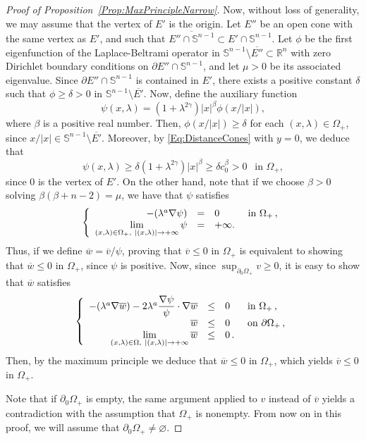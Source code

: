 \documentclass[12pt,reqno]{amsart}
\theoremstyle{definition}
\theoremstyle{remark}
\newcommand{\con}[1]{\mathbb{#1}}
\newcommand{\R}{\con{R}} %
\newcommand{\Sph}{\con{S}} %
\newcommand{\s}{\gamma}
\newcommand\beqc[1]{\left\{\begin{array}{#1}}
\newcommand\eeqc{\end{array} \right.}
\def\PDEsystem{rcll}
\let\div\relax
\DeclareMathOperator{\div}{div}
\def\ds{\displaystyle}
\numberwithin{equation}{section}
\begin{document}
\begin{proof}[Proof of Proposition~\ref{Prop:MaxPrincipleNarrow}]
Now, without loss of generality, we may assume that the vertex of $E'$ is the origin. Let $E''$ be an open cone with the same vertex as $E'$, and such that $\overline{E''\cap \Sph^{n-1}} \subset E'\cap \Sph^{n-1}$. Let $\phi$ be the first eigenfunction of the Laplace-Beltrami operator in $\Sph^{n-1} \setminus \overline{E''}\subset \R^n$ with zero Dirichlet boundary conditions on $\partial E'' \cap \Sph^{n-1}$, and let $\mu>0$ be its associated eigenvalue. Since $\partial E'' \cap \Sph^{n-1}$ is contained in $E'$, there exists a positive constant $\delta$ such that $\phi\geq \delta > 0$ in $\Sph^{n-1} \setminus \overline{E'}$. Now, define the auxiliary function
$$ 
\psi(x,\lambda) = (1+\lambda^{2\s}) |x|^\beta \phi(x/|x|), 
$$
where $\beta$ is a positive real number. Then, $\phi(x/|x|)\geq \delta$ for each $(x,\lambda) \in\Omega_+$,  since $x/|x| \in \Sph^{n-1} \setminus \overline{E'}$. Moreover, by \eqref{Eq:DistanceCones} with $y=0$, we deduce that
$$ 
\psi(x,\lambda) \geq \delta (1+\lambda^{2\s}) |x|^\beta \geq \delta c_0^\beta > 0 \ \ \text{ in } \Omega_+,
$$
since $0$ is the vertex of $E'$.
On the other hand, note that if we choose $\beta>0$ solving $\beta(\beta+n-2)=\mu$, we have that $\psi$ satisfies
$$
\beqc{\PDEsystem}
-\div(\lambda^a \nabla \psi) &=& 0 & \text{ in } \Omega_+\,, \\
\ds \lim_{(x,\lambda)\in \Omega_+, \ |(x,\lambda)|\to +\infty} \psi & = & +\infty.
\eeqc
$$
Thus, if we define $\overline{w}=\overline{v}/\psi$, proving that $\overline{v} \leq 0$ in $\Omega_+$ is equivalent to showing that $\overline{w}\leq 0$ in $\Omega_+$, since $\psi$ is positive. Now, since $\sup_{\partial_0 \Omega_+} v \geq 0$, it is easy to show that $\overline{w}$ satisfies
\begin{equation}
\label{Eq:wTildeEquationNarrow}
\beqc{\PDEsystem}
-\div(\lambda^a \nabla \overline{w})-2\lambda^a\dfrac{\nabla \psi}{\psi}\cdot\nabla \overline{w} &\leq& 0 & \text{ in } \Omega_+\,, \\
\overline{w} &\leq& 0 & \text{ on } \partial\Omega_+\,, \\
\ds \lim_{(x,\lambda)\in \Omega, \ |(x,\lambda)|\to +\infty} \overline{w} & \leq & 0\,.
\eeqc
\end{equation}
Then, by the maximum principle we deduce that $\overline{w}\leq 0$ in $\Omega_+$, which yields $\overline{v}\leq 0$ in $\Omega_+$.

Note that if $\partial_0 \Omega_+$ is empty, the same argument applied to $v$ instead of $\overline{v}$ yields a contradiction with the assumption that $\Omega_+$ is nonempty. From now on in this proof, we will assume that $\partial_0 \Omega_+ \neq \varnothing$.


\end{proof}
\end{document}
